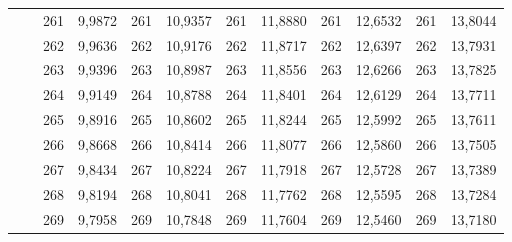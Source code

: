 \documentclass[a4paper,12pt]{article} %
\begin{document}
\begin{longtable}[c]{cccccccccc|c|c|}
	& \multicolumn{1}{c|}{} & \multicolumn{1}{c|}{261} & \multicolumn{1}{c|}{9,9872} & \multicolumn{1}{c|}{261} & \multicolumn{1}{c|}{10,9357} & \multicolumn{1}{c|}{261} & \multicolumn{1}{c|}{11,8880} & \multicolumn{1}{c|}{261} & 12,6532 & 261 & 13,8044 \\ \cline{3-12} 
	& \multicolumn{1}{c|}{} & \multicolumn{1}{c|}{262} & \multicolumn{1}{c|}{9,9636} & \multicolumn{1}{c|}{262} & \multicolumn{1}{c|}{10,9176} & \multicolumn{1}{c|}{262} & \multicolumn{1}{c|}{11,8717} & \multicolumn{1}{c|}{262} & 12,6397 & 262 & 13,7931 \\ \cline{3-12} 
	& \multicolumn{1}{c|}{} & \multicolumn{1}{c|}{263} & \multicolumn{1}{c|}{9,9396} & \multicolumn{1}{c|}{263} & \multicolumn{1}{c|}{10,8987} & \multicolumn{1}{c|}{263} & \multicolumn{1}{c|}{11,8556} & \multicolumn{1}{c|}{263} & 12,6266 & 263 & 13,7825 \\ \cline{3-12} 
	& \multicolumn{1}{c|}{} & \multicolumn{1}{c|}{264} & \multicolumn{1}{c|}{9,9149} & \multicolumn{1}{c|}{264} & \multicolumn{1}{c|}{10,8788} & \multicolumn{1}{c|}{264} & \multicolumn{1}{c|}{11,8401} & \multicolumn{1}{c|}{264} & 12,6129 & 264 & 13,7711 \\ \cline{3-12} 
	& \multicolumn{1}{c|}{} & \multicolumn{1}{c|}{265} & \multicolumn{1}{c|}{9,8916} & \multicolumn{1}{c|}{265} & \multicolumn{1}{c|}{10,8602} & \multicolumn{1}{c|}{265} & \multicolumn{1}{c|}{11,8244} & \multicolumn{1}{c|}{265} & 12,5992 & 265 & 13,7611 \\ \cline{3-12} 
	& \multicolumn{1}{c|}{} & \multicolumn{1}{c|}{266} & \multicolumn{1}{c|}{9,8668} & \multicolumn{1}{c|}{266} & \multicolumn{1}{c|}{10,8414} & \multicolumn{1}{c|}{266} & \multicolumn{1}{c|}{11,8077} & \multicolumn{1}{c|}{266} & 12,5860 & 266 & 13,7505 \\ \cline{3-12} 
	& \multicolumn{1}{c|}{} & \multicolumn{1}{c|}{267} & \multicolumn{1}{c|}{9,8434} & \multicolumn{1}{c|}{267} & \multicolumn{1}{c|}{10,8224} & \multicolumn{1}{c|}{267} & \multicolumn{1}{c|}{11,7918} & \multicolumn{1}{c|}{267} & 12,5728 & 267 & 13,7389 \\ \cline{3-12} 
	& \multicolumn{1}{c|}{} & \multicolumn{1}{c|}{268} & \multicolumn{1}{c|}{9,8194} & \multicolumn{1}{c|}{268} & \multicolumn{1}{c|}{10,8041} & \multicolumn{1}{c|}{268} & \multicolumn{1}{c|}{11,7762} & \multicolumn{1}{c|}{268} & 12,5595 & 268 & 13,7284 \\ \cline{3-12} 
	& \multicolumn{1}{c|}{} & \multicolumn{1}{c|}{269} & \multicolumn{1}{c|}{9,7958} & \multicolumn{1}{c|}{269} & \multicolumn{1}{c|}{10,7848} & \multicolumn{1}{c|}{269} & \multicolumn{1}{c|}{11,7604} & \multicolumn{1}{c|}{269} & 12,5460 & 269 & 13,7180 \\ \cline{3-12} 

\end{longtable}
\end{document}
